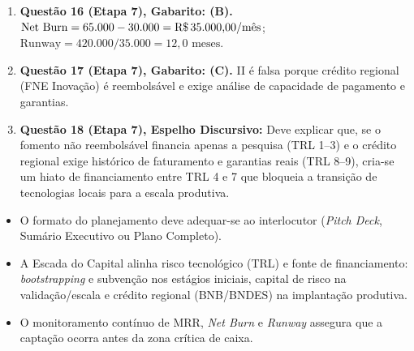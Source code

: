\begin{boxGabarito}
\begin{enumerate}[leftmargin=1.5em, itemsep=4pt]
    \item \textbf{Questão 16 (Etapa 7), Gabarito: (B).} $\text{Net Burn} = 65.000 - 30.000 = \text{R\$\,35.000,00/mês}$; $\text{Runway} = 420.000 / 35.000 = 12{,}0\text{ meses}$.
    \item \textbf{Questão 17 (Etapa 7), Gabarito: (C).} II é falsa porque crédito regional (FNE Inovação) é reembolsável e exige análise de capacidade de pagamento e garantias.
    \item \textbf{Questão 18 (Etapa 7), Espelho Discursivo:} Deve explicar que, se o fomento não reembolsável financia apenas a pesquisa (TRL 1–3) e o crédito regional exige histórico de faturamento e garantias reais (TRL 8–9), cria-se um hiato de financiamento entre TRL 4 e 7 que bloqueia a transição de tecnologias locais para a escala produtiva.
  \end{enumerate}
\end{boxGabarito}

\begin{boxResumo}
  \begin{itemize}[leftmargin=1.4em, itemsep=2pt]
    \item O formato do planejamento deve adequar-se ao interlocutor (\textit{Pitch Deck}, Sumário Executivo ou Plano Completo).
    \item A Escada do Capital alinha risco tecnológico (TRL) e fonte de financiamento: \textit{bootstrapping} e subvenção nos estágios iniciais, capital de risco na validação/escala e crédito regional (BNB/BNDES) na implantação produtiva.
    \item O monitoramento contínuo de MRR, \textit{Net Burn} e \textit{Runway} assegura que a captação ocorra antes da zona crítica de caixa.
  \end{itemize}
\end{boxResumo}

